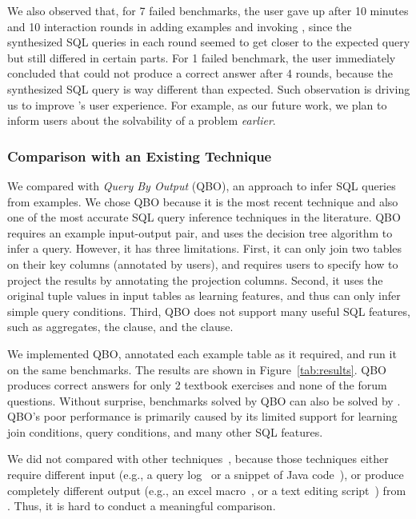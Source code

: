 We also observed that,
for 7 failed benchmarks, the user
gave up after 10 minutes and
10 interaction rounds in adding
examples and invoking \ourtool, since the synthesized
SQL queries in each round seemed to get closer to the expected
query but still differed in certain parts.
For 1 failed benchmark, the user immediately
concluded that \ourtool could not produce a correct
answer after 4 rounds, because the synthesized SQL
query is way different than expected.
Such observation is driving us to improve \ourtool's
user experience. For example, as our future work,
we plan to inform users about the solvability of a problem
\textit{earlier}. 



\subsubsection{Comparison with an Existing Technique}
\label{sec:comparison}
We compared \ourtool with \textit{Query By Output} (QBO), an
approach to infer SQL queries~\cite{Tran:2009} from examples.
We chose QBO because it is the most recent technique and also one
of the most accurate SQL query inference techniques in
the literature. QBO requires an example input-output pair, and
uses the decision tree algorithm to infer a query.
However, it
has three limitations. First, 
it can only join two tables on their key columns (annotated by users), and requires
users to specify how to project the results
by annotating the projection columns.
Second, it uses the original tuple values
in input tables as learning features, and thus can only
infer simple query conditions. Third, QBO does not support
many useful SQL features, such as aggregates, the 
clause, and the  clause.

We implemented QBO, annotated
each example table as it required, and run it
on the same benchmarks. The results are shown in Figure~\ref{tab:results}.
QBO produces correct answers
for only 2 textbook exercises and none of the forum questions.
Without surprise, 
benchmarks solved by QBO can also be solved by \ourtool.
QBO's poor performance is primarily caused by its
limited support for learning join conditions,
query conditions, and many other SQL features.

We did not compared \ourtool with other techniques~\cite{Howe:2011,
abs-1208-2013, Harris:2011, Kandel:2011}, because
those techniques either require different input
(e.g., a query log~\cite{Khoussainova:2010, Howe:2011}
or a snippet of Java code~\cite{abs-1208-2013}), 
or produce completely different
output (e.g., an excel macro~\cite{Harris:2011}, or a
text editing script~\cite{Kandel:2011}) from \ourtool.
Thus, it is hard to conduct a meaningful comparison.

